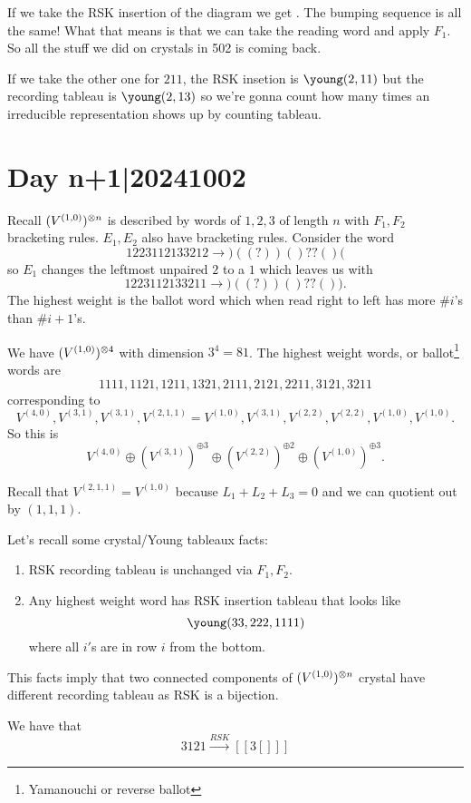 \documentclass[12pt]{memoir}
\begin{document}
\begin{Ex}
    If we take the RSK insertion of the diagram we get . The bumping sequence is all the same! What that means is that we can take the reading word and apply $F_1$. So all the stuff we did on crystals in 502 is coming back.\par
    If we take the other one for $211$, the RSK insetion is $\young(2,11)$ but the recording tableau is $\young(2,13)$ so we're gonna count how many times an irreducible representation shows up by counting tableau.
\end{Ex}

\section{Day n+1|20241002}

Recall $(V^{(1,0)})^{\otimes n}$ is described by words of $1,2,3$ of length $n$ with $F_1,F_2$ bracketing rules.
$E_1,E_2$ also have bracketing rules. Consider the word
$$1223112133212\to)((?))()??()($$
so $E_1$ changes the leftmost unpaired $2$ to a $1$ which leaves us with 
$$1223112133211\to)((?))()??()).$$
The highest weight is the ballot word which when read right to left has more $\#i$'s than $\#i+1$'s.

\begin{Ex}
    We have $(V^{(1,0)})^{\otimes 4}$ with dimension $3^4=81$. The highest weight words, or ballot\footnote{Yamanouchi or reverse ballot} words are
    $$1111,1121,1211,1321,2111,2121,2211,3121,3211$$
    corresponding to 
    $$V^{(4,0)},V^{(3,1)},V^{(3,1)},V^{(2,1,1)}=V^{(1,0)},V^{(3,1)},V^{(2,2)},V^{(2,2)},V^{(1,0)},V^{(1,0)}.$$
    So this is 
    $$V^{(4,0)}\oplus (V^{(3,1)})^{\oplus 3}\oplus(V^{(2,2)})^{\oplus 2}\oplus(V^{(1,0)})^{\oplus 3}.$$
\end{Ex}
Recall that $V^{(2,1,1)}=V^{(1,0)}$ because $L_1+L_2+L_3=0$ and we can quotient out by $(1,1,1)$.\par
Let's recall some crystal/Young tableaux facts:
\begin{enumerate}
    \item RSK recording tableau is unchanged via $F_1,F_2$.
    \item Any highest weight word has RSK insertion tableau that looks like 
    $$\young(33,222,1111)$$
    where all $i'$s are in row $i$ from the bottom.
\end{enumerate}
This facts imply that two connected components of $(V^{(1,0)})^{\otimes n}$ crystal have different recording tableau as RSK is a bijection.
\begin{Ex}
    We have that 
    $$3121\xrightarrow{RSK}[[3[]]]$$
\end{Ex}
\end{document}
